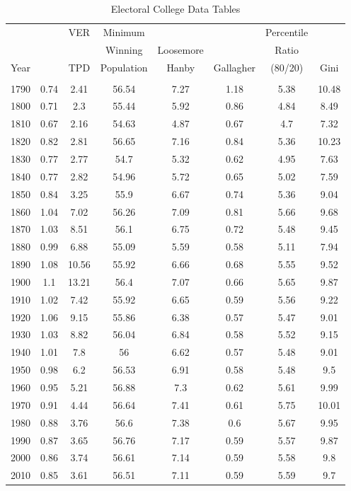  

\begin{table}[!htbp] \centering 
  \caption{Electoral College Data Tables} 
  \label{tab:app_ec} 
\begin{tabular}{c|ccccccc}
 &  & VER & Minimum &  &  & Percentile &  \\ 
  &   &   & Winning & Loosemore &  & Ratio &  \\ 
 Year &  & TPD & Population & Hanby & Gallagher & (80/20) & Gini \\ 
\hline \\[-1.8ex] 
1790 & 0.74 & 2.41 & 56.54 & 7.27 & 1.18 & 5.38 & 10.48 \\
1800 & 0.71 & 2.3 & 55.44 & 5.92 & 0.86 & 4.84 & 8.49 \\
1810 & 0.67 & 2.16 & 54.63 & 4.87 & 0.67 & 4.7 & 7.32 \\
1820 & 0.82 & 2.81 & 56.65 & 7.16 & 0.84 & 5.36 & 10.23 \\
1830 & 0.77 & 2.77 & 54.7 & 5.32 & 0.62 & 4.95 & 7.63 \\
1840 & 0.77 & 2.82 & 54.96 & 5.72 & 0.65 & 5.02 & 7.59 \\
1850 & 0.84 & 3.25 & 55.9 & 6.67 & 0.74 & 5.36 & 9.04 \\
1860 & 1.04 & 7.02 & 56.26 & 7.09 & 0.81 & 5.66 & 9.68 \\
1870 & 1.03 & 8.51 & 56.1 & 6.75 & 0.72 & 5.48 & 9.45 \\
1880 & 0.99 & 6.88 & 55.09 & 5.59 & 0.58 & 5.11 & 7.94 \\
1890 & 1.08 & 10.56 & 55.92 & 6.66 & 0.68 & 5.55 & 9.52 \\
1900 & 1.1 & 13.21 & 56.4 & 7.07 & 0.66 & 5.65 & 9.87 \\
1910 & 1.02 & 7.42 & 55.92 & 6.65 & 0.59 & 5.56 & 9.22 \\
1920 & 1.06 & 9.15 & 55.86 & 6.38 & 0.57 & 5.47 & 9.01 \\
1930 & 1.03 & 8.82 & 56.04 & 6.84 & 0.58 & 5.52 & 9.15 \\
1940 & 1.01 & 7.8 & 56 & 6.62 & 0.57 & 5.48 & 9.01 \\
1950 & 0.98 & 6.2 & 56.53 & 6.91 & 0.58 & 5.48 & 9.5 \\
1960 & 0.95 & 5.21 & 56.88 & 7.3 & 0.62 & 5.61 & 9.99 \\
1970 & 0.91 & 4.44 & 56.64 & 7.41 & 0.61 & 5.75 & 10.01 \\
1980 & 0.88 & 3.76 & 56.6 & 7.38 & 0.6 & 5.67 & 9.95 \\
1990 & 0.87 & 3.65 & 56.76 & 7.17 & 0.59 & 5.57 & 9.87 \\
2000 & 0.86 & 3.74 & 56.61 & 7.14 & 0.59 & 5.58 & 9.8 \\
2010 & 0.85 & 3.61 & 56.51 & 7.11 & 0.59 & 5.59 & 9.7 \\
\end{tabular}
\tabnotes{}
\end{table}

 
